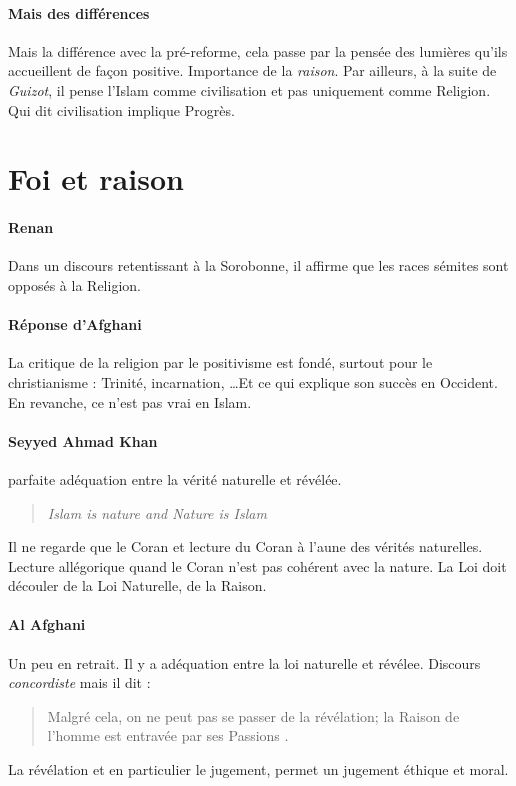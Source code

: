   \paragraph{Mais des différences} Mais la différence avec la pré-reforme, cela passe par la pensée des lumières qu'ils accueillent de façon positive. Importance de la \textit{raison}. Par ailleurs, à la suite de \textit{Guizot}, il pense l'Islam comme civilisation et pas uniquement comme Religion. Qui dit civilisation implique Progrès. 
   
  
  \section{Foi et raison}
  
 \paragraph{Renan } Dans un discours retentissant à la Sorobonne, il affirme que les races sémites sont opposés à la Religion.
 
 \paragraph{Réponse d'Afghani} La critique de la religion par le positivisme est fondé, surtout pour le christianisme : Trinité, incarnation, \ldots Et ce qui explique son succès en Occident. En revanche, ce n'est pas vrai en Islam.
 
 \paragraph{Seyyed Ahmad Khan} parfaite adéquation entre la vérité naturelle et révélée. 
 \begin{quote}
    \textit{ Islam is nature and Nature is Islam}
 \end{quote}
 Il ne regarde que le Coran et lecture du Coran à l'aune des vérités naturelles. Lecture allégorique quand le Coran n'est pas cohérent avec la nature. La Loi doit découler de la Loi Naturelle, de la Raison. 
 
 \paragraph{Al Afghani} Un peu en retrait. Il y a adéquation entre la loi naturelle et révélee. Discours \textit{concordiste}  mais il dit : 
 \begin{quote}
     Malgré cela, on ne peut pas se passer de la révélation; la Raison de l'homme est entravée par ses Passions . 
 \end{quote}
  La révélation et en particulier le jugement, permet un jugement éthique et moral. 
  
